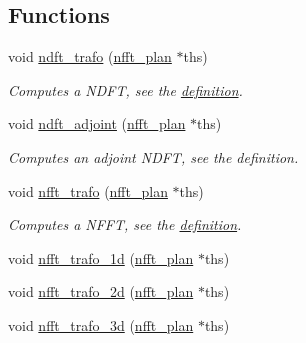\subsection*{Functions}
\begin{CompactItemize}
\item 
void \hyperlink{group__nfft_g27ef1bcb8dd3a3fc1cdbeee368ec1acf}{ndft\_\-trafo} (\hyperlink{structnfft__plan}{nfft\_\-plan} $\ast$ths)
\begin{CompactList}\small\item\em Computes a NDFT, see the \hyperlink{group__nfft_ndft_formula}{definition}. \item\end{CompactList}\item 
void \hyperlink{group__nfft_g03975608fdf8cfd8757f1f52b43ec51b}{ndft\_\-adjoint} (\hyperlink{structnfft__plan}{nfft\_\-plan} $\ast$ths)
\begin{CompactList}\small\item\em Computes an adjoint NDFT, see the definition. \item\end{CompactList}\item 
void \hyperlink{group__nfft_g9f1e6bd9f7f956a8679e6b413c97b421}{nfft\_\-trafo} (\hyperlink{structnfft__plan}{nfft\_\-plan} $\ast$ths)
\begin{CompactList}\small\item\em Computes a NFFT, see the \hyperlink{group__nfft_ndft_formula}{definition}. \item\end{CompactList}\item 
\hypertarget{group__nfft_ge6dff0553d273fc53a15ce4535df8087}{
void \hyperlink{group__nfft_ge6dff0553d273fc53a15ce4535df8087}{nfft\_\-trafo\_\-1d} (\hyperlink{structnfft__plan}{nfft\_\-plan} $\ast$ths)}
\label{group__nfft_ge6dff0553d273fc53a15ce4535df8087}

\item 
\hypertarget{group__nfft_gc05ae265993ff8e1396ac6c801c47ffe}{
void \hyperlink{group__nfft_gc05ae265993ff8e1396ac6c801c47ffe}{nfft\_\-trafo\_\-2d} (\hyperlink{structnfft__plan}{nfft\_\-plan} $\ast$ths)}
\label{group__nfft_gc05ae265993ff8e1396ac6c801c47ffe}

\item 
\hypertarget{group__nfft_g503e48334b8cdefb63f55941460354bf}{
void \hyperlink{group__nfft_g503e48334b8cdefb63f55941460354bf}{nfft\_\-trafo\_\-3d} (\hyperlink{structnfft__plan}{nfft\_\-plan} $\ast$ths)}
\label{group__nfft_g503e48334b8cdefb63f55941460354bf}


\end{CompactItemize}
